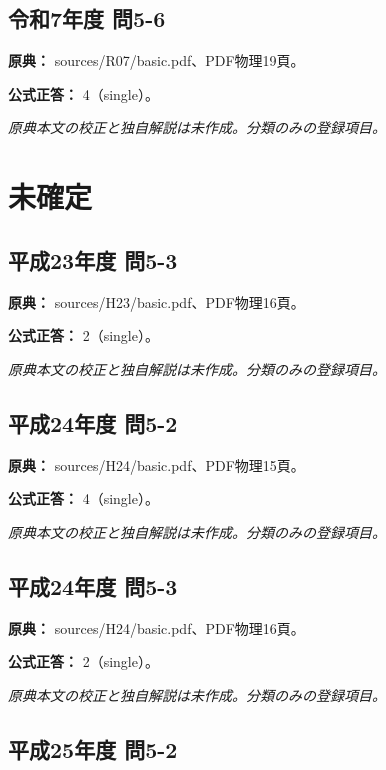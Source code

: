 \subsection{令和7年度 問5-6}
\label{q:r07-reg-basic-5-6}

\noindent\textbf{原典：} sources/R07/basic.pdf、PDF物理19頁。

\textbf{公式正答：} 4（single）。

\par\textit{原典本文の校正と独自解説は未作成。分類のみの登録項目。}

\section{未確定}

\subsection{平成23年度 問5-3}
\label{q:h23-reg-basic-5-3}

\noindent\textbf{原典：} sources/H23/basic.pdf、PDF物理16頁。

\textbf{公式正答：} 2（single）。

\par\textit{原典本文の校正と独自解説は未作成。分類のみの登録項目。}

\subsection{平成24年度 問5-2}
\label{q:h24-reg-basic-5-2}

\noindent\textbf{原典：} sources/H24/basic.pdf、PDF物理15頁。

\textbf{公式正答：} 4（single）。

\par\textit{原典本文の校正と独自解説は未作成。分類のみの登録項目。}

\subsection{平成24年度 問5-3}
\label{q:h24-reg-basic-5-3}

\noindent\textbf{原典：} sources/H24/basic.pdf、PDF物理16頁。

\textbf{公式正答：} 2（single）。

\par\textit{原典本文の校正と独自解説は未作成。分類のみの登録項目。}

\subsection{平成25年度 問5-2}
\label{q:h25-reg-basic-5-2}

